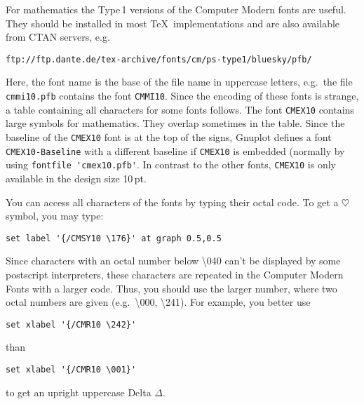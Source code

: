 \documentclass[a4paper,10pt]{article}
\begin{document}
For mathematics the Type\,1 versions of the Computer Modern fonts are
useful.
They should be installed in most \TeX\ implementations and are also
available from CTAN servers, e.g.
\begin{verbatim}
ftp://ftp.dante.de/tex-archive/fonts/cm/ps-type1/bluesky/pfb/
\end{verbatim}
Here, the font name is the base of the file name in uppercase letters,
e.g.\ the file \verb|cmmi10.pfb| contains the font \verb|CMMI10|.
Since the encoding of these fonts is strange, a table containing all
characters for some fonts follows.
The font \verb|CMEX10| contains large symbols for mathematics. They
overlap sometimes in the table. Since the baseline of the
\verb|CMEX10| font is at the top of the signs, Gnuplot defines a font
\verb|CMEX10-Baseline| with a different baseline if \verb|CMEX10| is
embedded (normally by using \verb|fontfile 'cmex10.pfb'|.
In contrast to the other fonts, \verb|CMEX10| is only available in the
design size 10\,pt.

You can access all characters of the fonts by typing their octal code.
To get a $\heartsuit$ symbol, you may type:
\begin{verbatim}
set label '{/CMSY10 \176}' at graph 0.5,0.5
\end{verbatim}
Since characters with an octal number below \textbackslash 040 can't
be displayed by some postscript interpreters, these characters are
repeated in the Computer Modern Fonts with a larger code.
Thus, you should use the larger number, where two octal numbers are
given (e.g.\ \textbackslash 000, \textbackslash 241).
For example, you better use
\begin{verbatim}
set xlabel '{/CMR10 \242}'
\end{verbatim}
than
\begin{verbatim}
set xlabel '{/CMR10 \001}'
\end{verbatim}
to get an upright uppercase Delta $\Delta$. 
\end{document}
